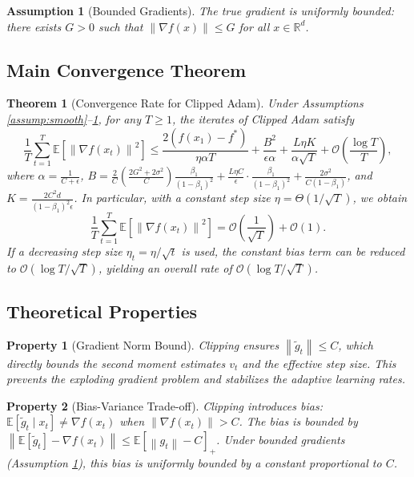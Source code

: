 \documentclass{article}
\newtheorem{assumption}{Assumption}
\newtheorem{theorem}{Theorem}
\newtheorem{property}{Property}
\newcommand{\R}{\mathbb{R}}
\newcommand{\E}{\mathbb{E}}
\newcommand{\norm}[1]{\left\| #1 \right\|}
\begin{document}
\begin{assumption}[Bounded Gradients] \label{assump:bounded_grad}
    The true gradient is uniformly bounded: there exists $G > 0$ such that $\norm{\nabla f(x)} \le G$ for all $x \in \R^d$.
\end{assumption}

\subsection*{Main Convergence Theorem}
\begin{theorem}[Convergence Rate for Clipped Adam] \label{thm:main}
    Under Assumptions \ref{assump:smooth}--\ref{assump:bounded_grad}, for any $T \ge 1$, the iterates of Clipped Adam satisfy
    \[
        \frac{1}{T} \sum_{t=1}^T \E\left[ \norm{\nabla f(x_t)}^2 \right]
        \le \frac{2(f(x_1)-f^*)}{\eta \alpha T} + \frac{B^2}{\epsilon \alpha} + \frac{L \eta K}{\alpha \sqrt{T}} + \mathcal{O}\left(\frac{\log T}{T}\right),
    \]
    where $\alpha = \frac{1}{C+\epsilon}$, 
    $B = \frac{2}{C}\left(\frac{2G^2+2\sigma^2}{C}\right)\frac{\beta_1}{(1-\beta_1)^2} + \frac{L \eta C}{\epsilon} \cdot \frac{\beta_1}{(1-\beta_1)^2} + \frac{2\sigma^2}{C(1-\beta_1)}$,
    and $K = \frac{2 C^2 d}{(1-\beta_1)^2 \epsilon}$.
    In particular, with a constant step size $\eta = \Theta(1/\sqrt{T})$, we obtain
    \[
        \frac{1}{T} \sum_{t=1}^T \E\left[ \norm{\nabla f(x_t)}^2 \right] = \mathcal{O}\left(\frac{1}{\sqrt{T}}\right) + \mathcal{O}(1).
    \]
    If a decreasing step size $\eta_t = \eta/\sqrt{t}$ is used, the constant bias term can be reduced to $\mathcal{O}(\log T/\sqrt{T})$, yielding an overall rate of $\mathcal{O}(\log T/\sqrt{T})$.
\end{theorem}

\subsection*{Theoretical Properties}
\begin{property}[Gradient Norm Bound]
    Clipping ensures $\norm{\tilde{g}_t} \le C$, which directly bounds the second moment estimates $v_t$ and the effective step size. This prevents the exploding gradient problem and stabilizes the adaptive learning rates.
\end{property}

\begin{property}[Bias-Variance Trade-off]
    Clipping introduces bias: $\E[\tilde{g}_t \mid x_t] \neq \nabla f(x_t)$ when $\norm{\nabla f(x_t)} > C$. The bias is bounded by $\norm{\E[\tilde{g}_t] - \nabla f(x_t)} \le \E[\norm{g_t} - C]_+$. Under bounded gradients (Assumption \ref{assump:bounded_grad}), this bias is uniformly bounded by a constant proportional to $C$.
\end{property}
\end{document}
